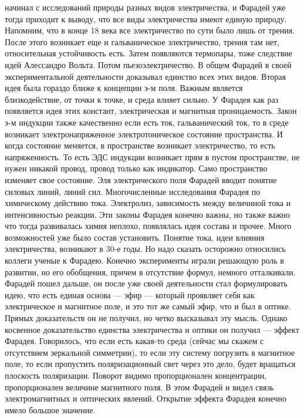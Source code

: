 \documentclass[a4paper, 12pt]{article}
\begin{document}
начинал с исследований природы разных видов электричества, и Фарадей уже 
тогда приходит к выводу, что все виды электричества имеют единую 
природу. Напомним, что в конце 18 века все электричество по сути было 
лишь от трения. После этого возникает еще и гальваническое 
электричество, трения там нет, относительная устойчивость есть. Затем 
появляются термопары, тоже следствие идей Алессандро Вольта. Потом 
пьезоэлектричество. В общем Фарадей в своей экспериментальной 
деятельности доказывал единство всех этих видов. Вторая идея была 
гораздо ближе к концепции э-м поля. Важным является близкодействие, от 
точки к точке, и среда влияет сильно. У Фарадея как раз появляется идея 
этих констант, электрическая и магнитная проницаемость. Закон э-м 
индукции также качественно если есть ток, гальванический ток, то в среде 
возникает электронапряженное электротоническое состояние пространства. 
И когда состояние меняется, в пространстве возникает электричество, то 
есть напряженность. То есть ЭДС индукции возникает прям в пустом 
пространстве, не нужен никакой провод, провод только как индикатор. Само 
пространство изменяет свое состояние. Эля электрического поля Фарадей 
вводит понятие силовых линий, линий сил. Многочисленные исследования 
Фарадея по химическому действию тока. Электролиз, зависимость между 
величиной тока и интенсивностью реакции. Эти законы Фарадея конечно 
важны, но также важно что тогда развивалась химия неплохо, появлялась 
идея состава и прочее. Много возможностей уже было состав установить. 
Понятие тока, идеи влияния электричества, возникают в 30-е годы. Но надо 
сказать осторожно относились коллеги ученые к Фарадею. Конечно 
эксперименты играли решающую роль в развитии, но  его обобщения, причем 
в отсутствие формул, немного отталкивали. Фарадей пошел дальше, он после 
уже своей деятельности стал формулировать идею, что есть единая основа 
--- эфир --- который проявляет себя как электрическое и магнитное поле, 
и это тот же самый эфир, что и был в оптике. Прямых доказательств он не 
получил, но четко высказывал эту мысль. Однако косвенное доказательство 
единства электричества и оптики он получил --- эффект Фарадея. 
Говорилось, что если есть какая-то среда (сейчас мы скажем с отсутствием 
зеркальной симметрии), то если эту систему погрузить в магнитное поле, 
то если пропустить поляризационный свет через это дело, будет вращаться 
плоскость поляризации. Поворот видимо пропорционален концентрации, 
пропорционален величине магнитного поля. В этом Фарадей и видел связь 
электромагнитных и оптических явлений. Открытие эффекта Фарадея конечно 
имело большое значение.
\end{document}
